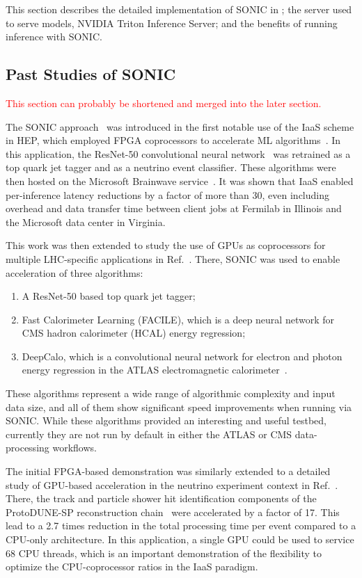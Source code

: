 This section describes the detailed implementation of SONIC in \CMSSW; the server used to serve models, NVIDIA Triton Inference Server; and the benefits of running inference with SONIC.

\subsection{Past Studies of SONIC}
\textcolor{red}{This section can probably be shortened and merged into the later section.}

The SONIC approach~\cite{SONIC_origin, SONIC_cms} was introduced in the first notable use of the IaaS scheme in HEP, which employed FPGA coprocessors to accelerate ML algorithms~\cite{Duarte:2019fta}. In this application, the ResNet-50 convolutional neural network~\cite{ResNet50} was retrained as a top quark jet tagger and as a neutrino event classifier. These algorithms were then hosted on the Microsoft Brainwave service~\cite{Brainwave}. It was shown that IaaS enabled per-inference latency reductions by a factor of more than 30, even including overhead and data transfer time between client jobs at Fermilab in Illinois and the Microsoft data center in Virginia.

This work was then extended to study the use of GPUs as coprocessors for multiple LHC-specific applications in Ref.~\cite{Krupa:2020bwg}. There, SONIC was used to enable acceleration of three algorithms:
\begin{enumerate}
    \item A ResNet-50 based top quark jet tagger;
    \item Fast Calorimeter Learning (FACILE), which is a deep neural network for CMS hadron calorimeter (HCAL) energy regression;
    \item DeepCalo, which is a convolutional neural network for electron and photon energy regression in the ATLAS electromagnetic calorimeter~\cite{deepcalo}.
\end{enumerate}
These algorithms represent a wide range of algorithmic complexity and input data size, and all of them show significant speed improvements when running via SONIC. While these algorithms provided an interesting and useful testbed, currently they are not run by default in either the ATLAS or CMS data-processing workflows.

The initial FPGA-based demonstration was similarly extended to a detailed study of GPU-based acceleration in the neutrino experiment context in Ref.~\cite{Wang:2020fjr}. There, the track and particle shower hit identification components of the ProtoDUNE-SP reconstruction chain~\cite{DUNE:2020cqd} were accelerated by a factor of 17. This lead to a 2.7 times reduction in the total processing time per event compared to a CPU-only architecture. In this application, a single GPU could be used to service 68 CPU threads, which is an important demonstration of the flexibility to optimize the CPU-coprocessor ratios in the IaaS paradigm.

